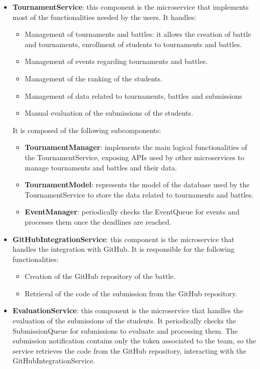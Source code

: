 \begin{itemize}
\begin{itemize}
    \end{itemize}
    \item \textbf{TournamentService}: this component is the microservice that implements most of the functionalities needed by the users. It handles:
    \begin{itemize}
        \item Management of tournaments and battles: it allows the creation of battle and tournaments, enrollment of students to tournaments and battles.
        \item Management of events regarding tournaments and battles.
        \item Management of the ranking of the students.
        \item Management of data related to tournaments, battles and submissions
        \item Manual evaluation of the submissions of the students.
    \end{itemize}
    It is composed of the following subcomponents:
    \begin{itemize}
        \item \textbf{TournamentManager}: implements the main logical functionalities of the TournamentService, exposing APIs used by other microservices to manage tournaments and battles and their data.
        \item \textbf{TournamentModel}: represents the model of the database used by the TournamentService to store the data related to tournaments and battles.
        \item \textbf{EventManager}: periodically checks the EventQueue for events and processes them once the deadlines are reached.
    \end{itemize}
    \item \textbf{GitHubIntegrationService}: this component is the microservice that handles the integration with GitHub. It is responsible for the following functionalities:
    \begin{itemize}
        \item Creation of the GitHub repository of the battle.
        \item Retrieval of the code of the submission from the GitHub repository.
    \end{itemize}
    \item \textbf{EvaluationService}: this component is the microservice that handles the evaluation of the submissions of the students. It periodically checks the SubmissionQueue for submissions to evaluate and processing them. The submission notification contains only the token associated to the team, so the service retrieves the code from the GitHub repository, interacting with the GitHubIntegrationService.

\end{itemize}
